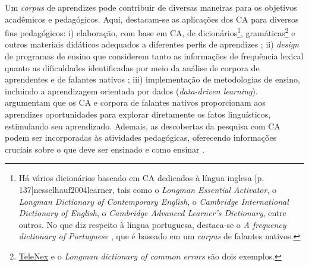 \documentclass[portuguese]{textolivre}
\begin{document}
Um \textit{corpus} de aprendizes pode contribuir de diversas maneiras para os objetivos acadêmicos e pedagógicos. Aqui, destacam-se as aplicações dos CA para diversos fins pedagógicos: i) elaboração, com base em CA, de dicionários\footnote{Há vários dicionários baseado em CA dedicados à língua inglesa \cite[p. 136]{granger2004computer}[p. 137]{nesselhauf2004learner}, tais como o \textit{Longman Essential Activator}, o \textit{Longman Dictionary of Contemporary English}, o \textit{Cambridge International Dictionary of English}, o \textit{Cambridge Advanced Learner’s Dictionary}, entre outros. No que diz respeito à língua portuguesa, destaca-se o \textit{A frequency dictionary of Portuguese} \cite{Dic2008}, que é baseado em um \textit{corpus} de falantes nativos.}, gramáticas\footnote{\href{http://www.telenex.hku.hk/telec/pmain/opening.htm}{TeleNex} e o \textit{Longman dictionary of common errors} \cite{turton1996longman} são dois exemplos.} e outros materiais didáticos adequados a diferentes perfis de aprendizes \cite{granger2004computer,nesselhauf2004learner,santos2016corpus}; 
ii) \textit{design} de programas de ensino que considerem tanto as informações de frequência lexical quanto as dificuldades identificadas por meio da análise de corpora de aprendentes e de falantes nativos \cite[p. 22-23]{Granger2002bird}; iii) implementação de metodologias de ensino, incluindo a aprendizagem orientada por dados (\textit{data-driven learning}). \textcite{Grangertribble1998} argumentam que os CA e corpora de falantes nativos proporcionam aos aprendizes oportunidades para explorar diretamente os fatos linguísticos, estimulando seu aprendizado. Ademais, as descobertas da pesquisa com CA podem ser incorporadas às atividades pedagógicas, oferecendo informações cruciais sobre o que deve ser ensinado e como ensinar \cite[p. 139]{nesselhauf2004learner}.
\end{document}
